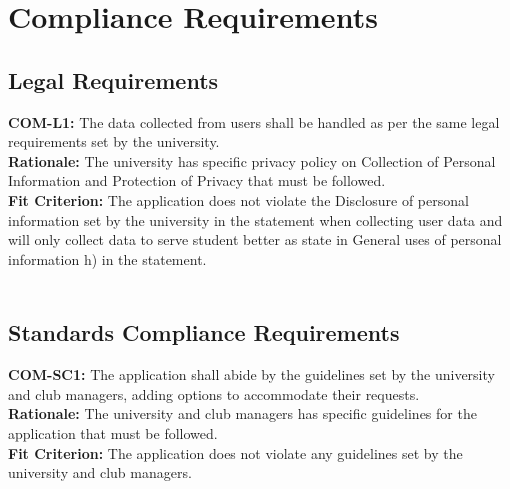 \documentclass[12pt]{article}
\begin{document}
\section{Compliance Requirements}
\subsection{Legal Requirements}
  \textbf{COM-L1:} The data collected from users shall be handled as per the same legal requirements set by the university.\\
  \textbf{Rationale:} The university has specific privacy policy on Collection of Personal Information and Protection of Privacy\cite{Privacy} that must be followed.\\
  \textbf{Fit Criterion:} The application does not violate the Disclosure of personal information set by the university in the statement when collecting user data and will only collect data to serve student better as state in General uses of personal information h) in the statement.\\\\

\subsection{Standards Compliance Requirements}
  \textbf{COM-SC1:} The application shall abide by the guidelines set by the university and club managers, adding options to accommodate their requests.\\
  \textbf{Rationale:} The university and club managers has specific guidelines for the application that must be followed.\\
  \textbf{Fit Criterion:} The application does not violate any guidelines set by the university and club managers.\\\\
\end{document}
